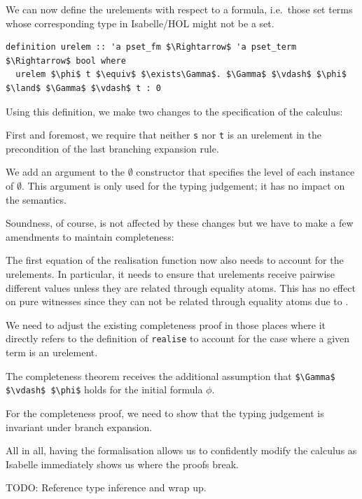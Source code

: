 \documentclass[runningheads]{llncs}
\begin{document}
We can now define the urelements with respect to a formula, i.e.\ those set terms whose corresponding type in Isabelle/HOL might not be a set.
\begin{lstlisting}
definition urelem :: 'a pset_fm $\Rightarrow$ 'a pset_term $\Rightarrow$ bool where
  urelem $\phi$ t $\equiv$ $\exists\Gamma$. $\Gamma$ $\vdash$ $\phi$ $\land$ $\Gamma$ $\vdash$ t : 0
\end{lstlisting}
Using this definition, we make two changes to the specification of the calculus: 
\begin{enumerate*}[label=(\arabic*)]
  \item First and foremost, we require that neither \lstinline!s! nor \lstinline!t! is an urelement in the precondition of the last branching expansion rule.
  \item We add an argument to the $\emptyset$ constructor that specifies the level of each instance of $\emptyset$.
    This argument is only used for the typing judgement; it has no impact on the semantics.
\end{enumerate*}

Soundness, of course, is not affected by these changes but we have to make a few amendments to maintain completeness:
\begin{enumerate*}[label=(\arabic*)]
  \item The first equation of the realisation function now also needs to account for the urelements.
    In particular, it needs to ensure that urelements receive pairwise different values unless they are related through equality atoms. 
    This has no effect on pure witnesses since they can not be related through equality atoms due to .
  \item We need to adjust the existing completeness proof in those places where it directly refers to the definition of \lstinline!realise! to account for the case where a given term is an urelement.
  \item The completeness theorem receives the additional assumption that \lstinline!$\Gamma$ $\vdash$ $\phi$! holds for the initial formula $\phi$. 
  \item For the completeness proof, we need to show that the typing judgement is invariant under branch expansion.
\end{enumerate*}

All in all, having the formalisation allows us to confidently modify the calculus as Isabelle immediately shows us where the proofs break.

TODO: Reference type inference and wrap up.
\end{document}
